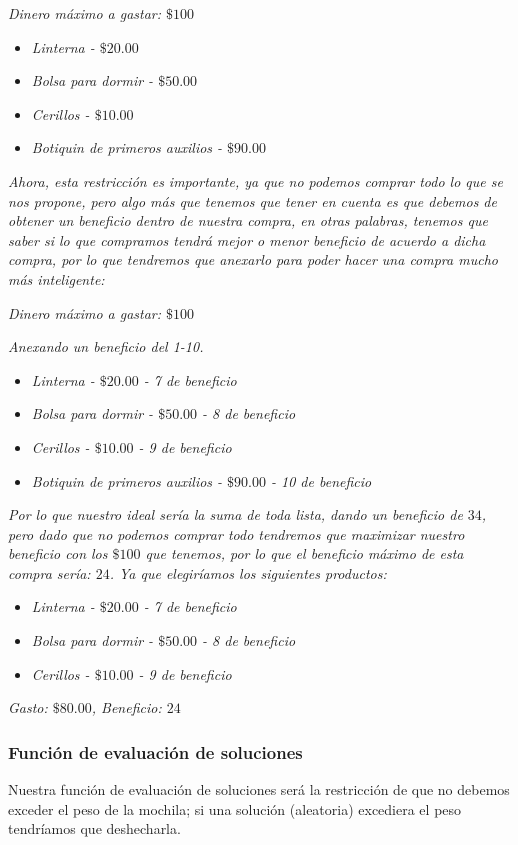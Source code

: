 \documentclass{article}
\begin{document}
\textit{Dinero máximo a gastar: $\$100$}
\begin{itemize}
	\item \textit{Linterna - $\$20.00$}
	\item \textit{Bolsa para dormir - $\$50.00$}
	\item \textit{Cerillos - $\$10.00$}
	\item \textit{Botiquin de primeros auxilios - $\$90.00$}
\end{itemize}

\textit{Ahora, esta restricción es importante, ya que no podemos comprar todo lo que se nos propone, pero algo más que tenemos que tener en cuenta es que debemos de obtener un beneficio dentro de nuestra compra, en otras palabras, tenemos que saber si lo que compramos tendrá mejor o menor beneficio de acuerdo a dicha compra, por lo que tendremos que anexarlo para poder hacer una compra mucho más inteligente:}

\textit{Dinero máximo a gastar: $\$100$}

\textit{Anexando un beneficio del 1-10.}
\begin{itemize}
	\item \textit{Linterna - $\$20.00$ - 7 de beneficio}
	\item \textit{Bolsa para dormir - $\$50.00$ - 8 de beneficio}
	\item \textit{Cerillos - $\$10.00$ - 9 de beneficio}
	\item \textit{Botiquin de primeros auxilios - $\$90.00$ - 10 de beneficio}
\end{itemize}

\textit{Por lo que nuestro ideal sería la suma de toda lista, dando un beneficio de $34$, pero dado que no podemos comprar todo tendremos que maximizar nuestro beneficio con los $\$100$ que tenemos, por lo que el beneficio máximo de esta compra sería: $24$. Ya que elegiríamos los siguientes productos:}
\begin{itemize}
	\item \textit{Linterna - $\$20.00$ - 7 de beneficio}
	\item \textit{Bolsa para dormir - $\$50.00$ - 8 de beneficio}
	\item \textit{Cerillos - $\$10.00$ - 9 de beneficio}
\end{itemize}

\textit{Gasto: $\$80.00$, Beneficio: $24$}
\subsubsection*{Función de evaluación de soluciones}
Nuestra función de evaluación de soluciones será la restricción de que no debemos exceder el peso de la mochila; si una solución (aleatoria) excediera el peso tendríamos que deshecharla.
\end{document}
